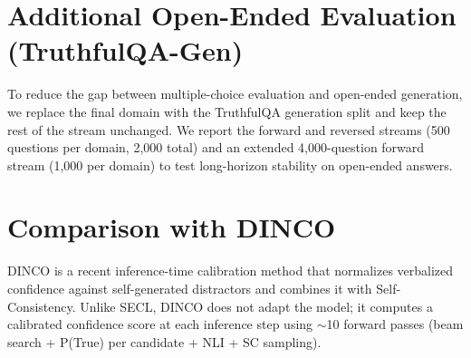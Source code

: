 \section{Additional Open-Ended Evaluation (TruthfulQA-Gen)} \label{app:tqgen}

To reduce the gap between multiple-choice evaluation and open-ended generation, we replace the final domain with the TruthfulQA generation split and keep the rest of the stream unchanged. We report the forward and reversed streams (500 questions per domain, 2{,}000 total) and an extended 4{,}000-question forward stream (1{,}000 per domain) to test long-horizon stability on open-ended answers.

\begin{table}[htbp]
\centering
\small
{}%
\caption{TruthfulQA generation-domain evaluation (Llama~3.2-3B).
SECL reduces ECE by 76\% on the 2k forward stream (0.195\,$\to$\,0.047), remains stable under reversed ordering, and at 4k still improves over the same-stream verbalized baseline by 66\% (0.179\,$\to$\,0.061).}
\label{tab:tqgen}
\end{table}

\section{Comparison with DINCO}
\label{app:dinco}

DINCO \citep{wang_calibrating_2025} is a recent inference-time calibration
method that normalizes verbalized confidence against self-generated
distractors and combines it with Self-Consistency.
Unlike SECL, DINCO does not adapt the model; it computes a calibrated
confidence score at each inference step using $\sim$10 forward passes
(beam search + P(True) per candidate + NLI + SC sampling).


